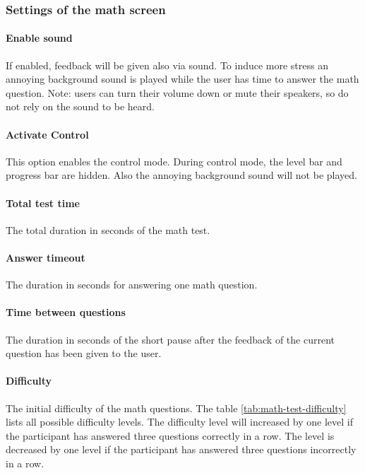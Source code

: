 \subsubsection*{Settings of the math screen}

\paragraph{Enable sound}
If enabled, feedback will be given also via sound. 
To induce more stress an annoying background sound is played while the user has time to answer the math question.
Note: users can turn their volume down or mute their speakers, so do not rely on the sound to be heard.

\paragraph{Activate Control}
This option enables the control mode.
During control mode, the level bar and progress bar are hidden.
Also the annoying background sound will not be played.

\paragraph{Total test time}
The total duration in seconds of the math test.

\paragraph{Answer timeout}
The duration in seconds for answering one math question.

\paragraph{Time between questions}
The duration in seconds of the short pause after the feedback of the current question has been given to the user.

\paragraph{Difficulty}
The initial difficulty of the math questions.
The table \ref{tab:math-test-difficulty} lists all possible difficulty levels.
The difficulty level will increased by one level if the participant has answered three questions correctly in a row.
The level is decreased by one level if the participant has answered three questions incorrectly in a row.

